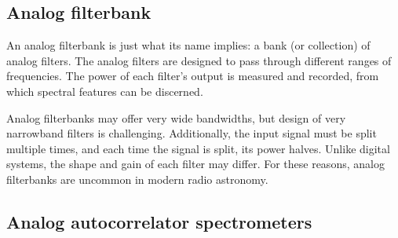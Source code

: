 \documentclass{ws-rv961x669}
\begin{document}
\subsection{Analog filterbank}\label{analog-filter-bank}

An analog filterbank is just what its name implies: a bank (or collection) of analog filters. The analog filters are designed to pass through different ranges of frequencies. The power of each filter's output is measured and recorded, from which spectral features can be discerned. 


Analog filterbanks may offer very wide bandwidths, but design of very narrowband filters is challenging. Additionally, the input signal must be split multiple times, and each time the signal is split, its power halves. Unlike digital systems, the shape and gain of each filter may differ. For these reasons, analog filterbanks are uncommon in modern radio astronomy.

\subsection{Analog autocorrelator spectrometers}\label{sub:analog-acs}



\end{document}
